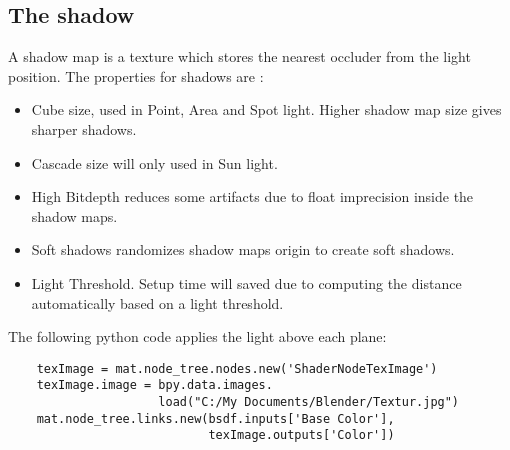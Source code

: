 \documentclass{article}
\begin{document}
 
\par
\newline
\subsection{The shadow}
A shadow map is a texture which stores the nearest occluder from the light position. The properties for shadows are :
  \begin{itemize}
  \item Cube size, used in Point, Area and Spot light. Higher shadow map size gives sharper shadows.
  \item Cascade size will only used in Sun light.
  \item High Bitdepth reduces some artifacts due to float imprecision inside the shadow maps.
  \item Soft shadows randomizes shadow maps origin to create soft shadows.
  \item Light Threshold. Setup time will saved due to computing the distance automatically based on a light threshold. 
 \end{itemize}
 
The following python code applies the light above each plane:

\begin{lstlisting}
    texImage = mat.node_tree.nodes.new('ShaderNodeTexImage')
    texImage.image = bpy.data.images.
                     load("C:/My Documents/Blender/Textur.jpg")
    mat.node_tree.links.new(bsdf.inputs['Base Color'],
                            texImage.outputs['Color'])
    \end{lstlisting}
     \newpage  \begin{figure}[htp]%
    \centering
    \qquad
\end{figure}
\end{document}
